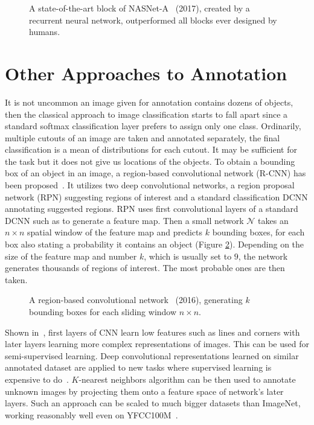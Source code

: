 \begin{figure}
	\centering
	
	
	\caption[A state-of-the-art block of NASNet-A]{A state-of-the-art block of NASNet-A~\cite{zoph2017learning} (2017), created by a recurrent neural network, outperformed all blocks ever designed by humans.}
	\label{fig:nasnet_block}
\end{figure}

\section{Other Approaches to Annotation}

It is not uncommon an image given for annotation contains dozens of objects, then the classical approach to image classification starts to fall apart since a standard softmax classification layer prefers to assign only one class. Ordinarily, multiple cutouts of an image are taken and annotated separately, the final classification is a mean of distributions for each cutout. It may be sufficient for the task but it does not give us locations of the objects. To obtain a bounding box of an object in an image, a region-based convolutional network (R-CNN) has been proposed~\cite{ren2015faster}. It utilizes two deep convolutional networks, a region proposal network (RPN) suggesting regions of interest and a standard classification DCNN annotating suggested regions. RPN uses first convolutional layers of a standard DCNN such as \cite{simonyan2014very} to generate a feature map. Then a small network $\mathcal{N}$ takes an $n\times n$ spatial window of the feature map and predicts $k$ bounding boxes, for each box also stating a probability it contains an object (Figure \ref{fig:faster_RCNN}). Depending on the size of the feature map and number $k$, which is usually set to $9$, the network generates thousands of regions of interest. The most probable ones are then taken.


\begin{figure}
	\centering
	
	
	\caption[A region-based convolutional network]{A region-based convolutional network~\cite{ren2015faster} (2016), generating $k$ bounding boxes for each sliding window $n\times n$.}
	\label{fig:faster_RCNN}
\end{figure}

Shown in~\cite{zeiler2014visualizing}, first layers of CNN learn low features such as lines and corners with later layers learning more complex representations of images. This can be used for semi-supervised learning. Deep convolutional representations learned on similar annotated dataset are applied to new tasks where supervised learning is expensive to do~\cite{donahue2014decaf}. $K$-nearest neighbors algorithm can be then used to annotate unknown images by projecting them onto a feature space of network's later layers. Such an approach can be scaled to much bigger datasets than ImageNet, working reasonably well even on YFCC100M~\cite{amato2017searching}.